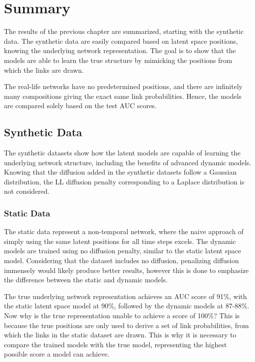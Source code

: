 \section{Summary}

The results of the previous chapter are summarized, starting with the synthetic data. The synthetic data are easily compared based on latent space positions, knowing the underlying network representation. The goal is to show that the models are able to learn the true structure by mimicking the positions from which the links are drawn.

The real-life networks have no predetermined positions, and there are infinitely many compositions giving the exact same link probabilities. Hence, the models are compared solely based on the test AUC scores.

\subsection{Synthetic Data}

    The synthetic datasets show how the latent models are capable of learning the underlying network structure, including the benefits of advanced dynamic models. Knowing that the diffusion added in the synthetic datasets follow a Gaussian distribution, the LL diffusion penalty corresponding to a Laplace distribution is not considered.
    
    \subsubsection{Static Data}
    
        The static data represent a non-temporal network, where the naive approach of simply using the same latent positions for all time steps excels. The dynamic models are trained using no diffusion penalty, similar to the static latent space model. Considering that the dataset includes no diffusion, penalizing diffusion immensely would likely produce better results, however this is done to emphasize the difference between the static and dynamic models.
        
        The true underlying network representation achieves an AUC score of 91\%, with the static latent space model at 90\%, followed by the dynamic models at 87-88\%. Now why is the true representation unable to achieve a score of 100\%? This is because the true positions are only used to derive a set of link probabilities, from which the links in the static dataset are drawn. This is why it is necessary to compare the trained models with the true model, representing the highest possible score a model can achieve.
    
